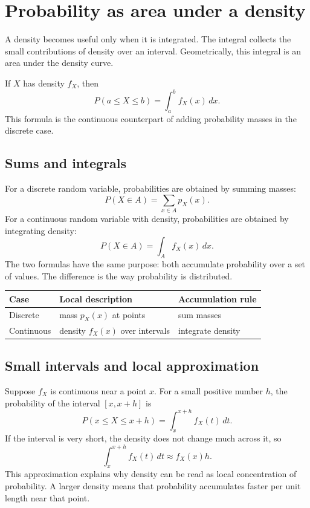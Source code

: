 \section{Probability as area under a density}

A density becomes useful only when it is integrated. The integral collects the
small contributions of density over an interval. Geometrically, this integral is
an area under the density curve.

If \(X\) has density \(f_X\), then
\[
P(a\leq X\leq b)=\int_a^b f_X(x)\,dx.
\]
This formula is the continuous counterpart of adding probability masses in the
discrete case.

\subsection*{Sums and integrals}

For a discrete random variable, probabilities are obtained by summing masses:
\[
P(X\in A)=\sum_{x\in A}p_X(x).
\]
For a continuous random variable with density, probabilities are obtained by
integrating density:
\[
P(X\in A)=\int_A f_X(x)\,dx.
\]
The two formulas have the same purpose: both accumulate probability over a set of
values. The difference is the way probability is distributed.

\begin{center}
\begin{tabular}{lll}
\toprule
Case & Local description & Accumulation rule \\
\midrule
Discrete & mass \(p_X(x)\) at points & sum masses \\
Continuous & density \(f_X(x)\) over intervals & integrate density \\
\bottomrule
\end{tabular}
\end{center}

\subsection*{Small intervals and local approximation}

Suppose \(f_X\) is continuous near a point \(x\). For a small positive number
\(h\), the probability of the interval \([x,x+h]\) is
\[
P(x\leq X\leq x+h)=\int_x^{x+h}f_X(t)\,dt.
\]
If the interval is very short, the density does not change much across it, so
\[
\int_x^{x+h}f_X(t)\,dt\approx f_X(x)h.
\]
This approximation explains why density can be read as local concentration of
probability. A larger density means that probability accumulates faster per unit
length near that point.

